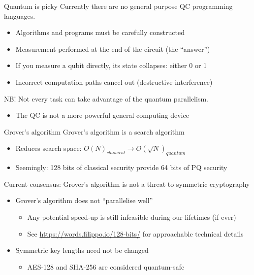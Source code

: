 \begin{frame}{Quantum is picky}
  Currently there are no general purpose QC programming languages.
    \begin{itemize}[<+(1)->]
      \item Algorithms and programs must be carefully constructed
      \item Measurement performed at the end of the circuit (the \enquote{answer})
      \item If you measure a qubit directly, its state collapses: either 0 or 1
      \item Incorrect computation paths cancel out (destructive interference)
    \end{itemize}

  \vspace*{1em}

  \pause
  NB! Not every task can take advantage of the quantum parallelism.
  \begin{itemize}[<+(1)->]
    \item The QC is not a more powerful general computing device
  \end{itemize}
\end{frame}

\begin{frame}{Grover's algorithm}
  Grover's algorithm is a search algorithm
  \begin{itemize}[<+(1)->]
    \item Reduces search space: $O(N)_\mathit{classical} \to O(\sqrt{N})_\mathit{quantum}$
    \item Seemingly: 128 bits of classical security provide 64 bits of PQ security
  \end{itemize}

  \vspace*{1em}

  \pause
  Current consensus: Grover's algorithm is not a threat to symmetric cryptography
  \begin{itemize}[<+(1)->]
    \item Grover's algorithm does not \enquote{parallelise well}
    \begin{itemize}
      \item Any potential speed-up is still infeasible during our lifetimes (if ever)
      \item See {\scriptsize \url{https://words.filippo.io/128-bits/}} for approachable technical details
    \end{itemize}
    \item Symmetric key lengths need not be changed
    \begin{itemize}
      \item AES-128 and SHA-256 are considered quantum-safe
    \end{itemize}
  \end{itemize}
\end{frame}

